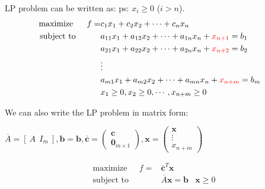 \documentclass[9pt]{article}
\begin{document}
\vspace{-9pt}
\begin{multicols}{2}

    LP problem can be written as: \quad \quad ps: $x_{i}\geq0$ ($i>n$).
    \[
    \begin{aligned}
        \text{maximize} \quad \ \ f = & c_1x_1 + c_2x_2 + \cdots + c_nx_n & \\
        \text{subject to} \quad \qquad & a_{11}x_1 + a_{12}x_2 + \cdots + a_{1n}x_n + \textcolor{red}{x_{n+1}} = b_1 & \\
                                & a_{21}x_1 + a_{22}x_2 + \cdots + a_{2n}x_n + \textcolor{red}{x_{n+2}} = b_2 & \\
                                & \vdots & \\
                                & a_{m1}x_1 + a_{m2}x_2 + \cdots + a_{mn}x_n + \textcolor{red}{x_{n+m}} = b_m & \\
                                & x_1 \geq 0, x_2 \geq 0, \cdots, x_{n+m} \geq 0 &
    \end{aligned}
    \]
    
    \columnbreak

    We can also write the LP problem in matrix form:

    \vspace{5pt}
    $
    \overline{A}= [ \ A  \ \ I_m \ ]
    ,\mathbf{b}=\mathbf{b}
    ,\overline{\mathbf{c}}=
    \begin{pmatrix}
        \mathbf{c} \\
        \mathbf{0}_{ m\times 1}
    \end{pmatrix}
    ,\mathbf{x}=
    \begin{pmatrix}
        \mathbf{x} \\
        \vdots \\
        x_{n+m}
    \end{pmatrix}
    $

    \[
    \begin{aligned}
        \text{maximize} \quad \ \ f = & \overline{\mathbf{c}}^T\mathbf{x} & \\
        \text{subject to} \quad \qquad & \overline{A}\mathbf{x} = \mathbf{b} & \mathbf{x} \geq 0 \\
    \end{aligned}
    \]

\end{multicols}
\vspace{-5pt}
\end{document}

